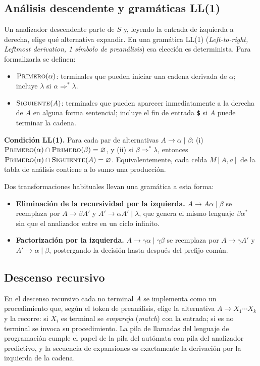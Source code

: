 \documentclass[11pt,a4paper]{article}
\newcommand{\tm}[1]{\textcolor{tmcolor}{\texttt{\textbf{#1}}}}
\newcommand{\PRIMERO}{\textsc{Primero}}
\newcommand{\SIGUIENTE}{\textsc{Siguiente}}
\begin{document}
\subsection{Análisis descendente y gramáticas LL(1)}
Un analizador descendente parte de $S$ y, leyendo la entrada de izquierda a derecha, elige qué
alternativa expandir. En una gramática \textsc{LL(1)} (\emph{Left-to-right, Leftmost derivation, 1 símbolo
de preanálisis}) esa elección es determinista. Para formalizarla se definen:

\begin{itemize}
  \item $\PRIMERO(\alpha)$: terminales que pueden iniciar una cadena derivada de $\alpha$; incluye $\lambda$ si $\alpha\Rightarrow^*\lambda$.
  \item $\SIGUIENTE(A)$: terminales que pueden aparecer inmediatamente a la derecha de $A$ en alguna
        forma sentencial; incluye el fin de entrada \tm{\$} si $A$ puede terminar la cadena.
\end{itemize}

\begin{clave}
\textbf{Condición LL(1).} Para cada par de alternativas $A\to\alpha\mid\beta$:
(i) $\PRIMERO(\alpha)\cap\PRIMERO(\beta)=\varnothing$, y
(ii) si $\beta\Rightarrow^*\lambda$, entonces $\PRIMERO(\alpha)\cap\SIGUIENTE(A)=\varnothing$.
Equivalentemente, cada celda $M[A,a]$ de la tabla de análisis contiene a lo sumo una producción.
\end{clave}

Dos transformaciones habituales llevan una gramática a esta forma:

\begin{itemize}
  \item \textbf{Eliminación de la recursividad por la izquierda.} $A\to A\alpha\mid\beta$ se reemplaza por
        $A\to\beta A'$ y $A'\to\alpha A'\mid\lambda$, que genera el mismo lenguaje $\beta\alpha^*$ sin que el
        analizador entre en un ciclo infinito.
  \item \textbf{Factorización por la izquierda.} $A\to\gamma\alpha\mid\gamma\beta$ se reemplaza por
        $A\to\gamma A'$ y $A'\to\alpha\mid\beta$, postergando la decisión hasta después del prefijo común.
\end{itemize}

\subsection{Descenso recursivo}
En el descenso recursivo cada no terminal $A$ se implementa como un procedimiento que, según el token de
preanálisis, elige la alternativa $A\to X_1\cdots X_k$ y la recorre: si $X_i$ es terminal se
\emph{empareja} (\emph{match}) con la entrada; si es no terminal se invoca su procedimiento. La pila de
llamadas del lenguaje de programación cumple el papel de la pila del autómata con pila del analizador
predictivo, y la secuencia de expansiones es exactamente la derivación por la izquierda de la cadena.
\end{document}
